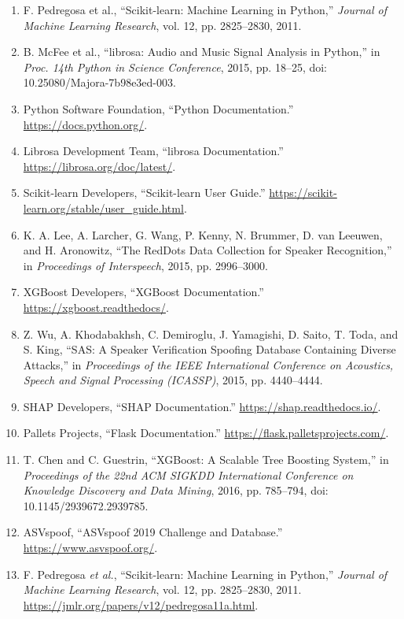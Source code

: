 \documentclass[12pt,a4paper]{report}
\begin{document}
\begin{enumerate}
    \item F. Pedregosa et al., ``Scikit-learn: Machine Learning in Python,'' \textit{Journal of Machine Learning Research}, vol. 12, pp. 2825--2830, 2011.

    \item B. McFee et al., ``librosa: Audio and Music Signal Analysis in Python,'' in \textit{Proc. 14th Python in Science Conference}, 2015, pp. 18--25, doi: 10.25080/Majora-7b98e3ed-003.

    \item Python Software Foundation, ``Python Documentation.''
    \url{https://docs.python.org/}.
    
    \item Librosa Development Team, ``librosa Documentation.''
    \url{https://librosa.org/doc/latest/}.
    
    \item Scikit-learn Developers, ``Scikit-learn User Guide.''
    \url{https://scikit-learn.org/stable/user_guide.html}.

    \item K. A. Lee, A. Larcher, G. Wang, P. Kenny, N. Brummer,
    D. van Leeuwen, and H. Aronowitz, ``The RedDots Data Collection
    for Speaker Recognition,'' in \textit{Proceedings of Interspeech},
    2015, pp. 2996--3000.

    \item XGBoost Developers, ``XGBoost Documentation.''
    \url{https://xgboost.readthedocs/}.
    
    \item Z. Wu, A. Khodabakhsh, C. Demiroglu, J. Yamagishi,
    D. Saito, T. Toda, and S. King, ``SAS: A Speaker Verification
    Spoofing Database Containing Diverse Attacks,'' in
    \textit{Proceedings of the IEEE International Conference on
    Acoustics, Speech and Signal Processing (ICASSP)}, 2015,
    pp. 4440--4444.
    
    
    \item SHAP Developers, ``SHAP Documentation.''
    \url{https://shap.readthedocs.io/}.
    
    \item Pallets Projects, ``Flask Documentation.''
    \url{https://flask.palletsprojects.com/}.
    
    \item T. Chen and C. Guestrin, ``XGBoost: A Scalable Tree Boosting
    System,'' in \textit{Proceedings of the 22nd ACM SIGKDD International
    Conference on Knowledge Discovery and Data Mining}, 2016, pp. 785--794,
    doi: 10.1145/2939672.2939785.

    \item ASVspoof, ``ASVspoof 2019 Challenge and Database.''
    \url{https://www.asvspoof.org/}.
    
    \item F. Pedregosa \textit{et al.}, ``Scikit-learn: Machine Learning
    in Python,'' \textit{Journal of Machine Learning Research},
    vol. 12, pp. 2825--2830, 2011.
    \url{https://jmlr.org/papers/v12/pedregosa11a.html}.
    
    
\end{enumerate}
\end{document}

